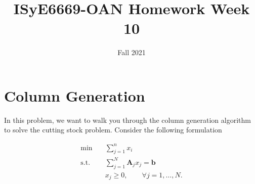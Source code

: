 \documentclass[11pt]{article}
\title{ISyE6669-OAN Homework Week 10}
\author{Fall 2021}
\date{}
\newcommand{\mb}[1]{\ensuremath{\boldsymbol{#1}}}
\begin{document}
\maketitle

\section*{Column Generation}
In this problem, we want to walk you through the column generation algorithm to solve the cutting stock problem. Consider the following formulation

\begin{align*}
\min \quad & \sum_{j=1}^n x_i \\
\text{s.t.}\quad & \sum_{j=1}^N \mb{A}_j x_j = \mb{b} \\
& x_j \geq 0, \qquad \forall j=1,\dots, N.
\end{align*}
\end{document}
